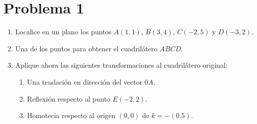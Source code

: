 \section{Problema 1}
\begin{enumerate}
	\item Localice en un plano los puntos $A(1,1)$, $B(3,4)$, $C(-2,5)$ y $D(-3,2)$. 
	\item Una de los puntos para obtener el cuadrilátero $ABCD$. 
	\item Aplique ahora las siguientes transformaciones al cuadrilátero original: 
	\begin{enumerate}
		\item Una traslación en dirección del vector $0A$. 
		\item Reflexión respecto al punto $E(-2,2)$. 
		\item Homotecia respecto al origen $(0,0)$ de $k=-(0.5)$. 
	\end{enumerate}
\end{enumerate}
